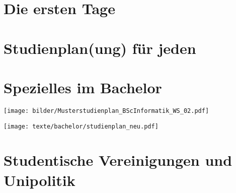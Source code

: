 \documentclass[]{papertex}
\begin{document}
	\thispagestyle{empty}
	\clearpage
	\setcounter{page}{1}
	\tableofcontents
	
	\newpage
	\section{Die ersten Tage}
		
		
	\newpage
	\section{Studienplan(ung) für jeden}
		\label{studienplan}
	\newpage
	\section{Spezielles im Bachelor}
		\label{bachelor}
		
		
		
		
		\begin{minipage}{1.0\linewidth}
			\begin{center}     
			\label{musterstudienplan}
			\texttt{[image: bilder/Musterstudienplan\_BScInformatik\_WS\_02.pdf]}
			\end{center}  
		\end{minipage}
		\newpage
		\begin{minipage}{1.0\linewidth}
		\begin{center} 
  			\texttt{[image: texte/bachelor/studienplan\_neu.pdf]}
  			\label{studienplan_neu}
		\end{center}
		\end{minipage}
	 
	
	\newpage
%		
	\section{Studentische Vereinigungen und Unipolitik}
		\label{politik}
		\begin{multicols}{2}
			
			
			

		\end{multicols}
	\newpage
\end{document}
